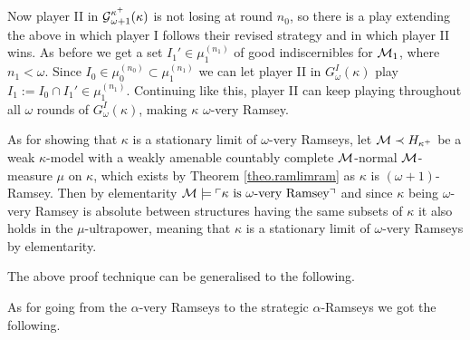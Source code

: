 \documentclass[../../main]{subfiles}
\begin{document}
{	

	Now player II in $\operatorname{\mathcal G}_{\omega+1}^{\kappa^+}(\kappa)$ is not losing at round $n_0$, so there is a play extending the above in which player I follows their revised strategy and in which player II wins. As before we get a set $I_1'\in\mu_1^{(n_1)}$ of good indiscernibles for $\operatorname{\mathcal M}_1$, where $n_1<\omega$. Since $I_0\in\mu_0^{(n_0)}\subset\mu_1^{(n_1)}$ we can let player II in $G_\omega^I(\kappa)$ play $I_1:=I_0\cap I_1'\in\mu_1^{(n_1)}$. Continuing like this, player II can keep playing throughout all $\omega$ rounds of $G_\omega^I(\kappa)$, making $\kappa$ $\omega$-very Ramsey.

	\qquad As for showing that $\kappa$ is a stationary limit of $\omega$-very Ramseys, let $\operatorname{\mathcal M}\prec H_{\kappa^+}$ be a weak $\kappa$-model with a weakly amenable countably complete $\operatorname{\mathcal M}$-normal $\operatorname{\mathcal M}$-measure $\mu$ on $\kappa$, which exists by Theorem \ref{theo.ramlimram} as $\kappa$ is $(\omega{+}1)$-Ramsey. Then by elementarity $\operatorname{\mathcal M}\models\ulcorner \kappa\text{ is $\omega$-very Ramsey} \urcorner$ and since $\kappa$ being $\omega$-very Ramsey is absolute between structures having the same subsets of $\kappa$ it also holds in the $\mu$-ultrapower, meaning that $\kappa$ is a stationary limit of $\omega$-very Ramseys by elementarity. 
}

The above proof technique can be generalised to the following.


As for going from the $\alpha$-very Ramseys to the strategic $\alpha$-Ramseys we got the following.
\end{document}
